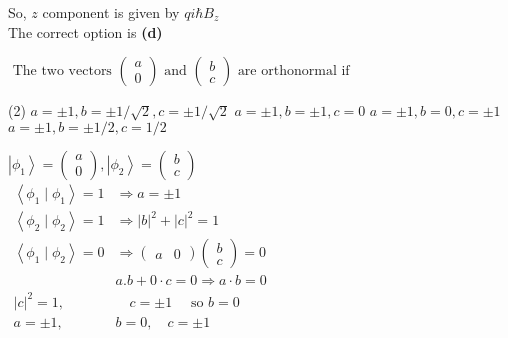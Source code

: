 \begin{enumerate}
\begin{answer}
	So, $z$ component is given by $q i \hbar B_{z}$\\
	The correct option is \textbf{(d)}
\end{answer}
\begin{minipage}{\textwidth}
	\item $\text { The two vectors }\left(\begin{array}{l}
		a \\
		0
	\end{array}\right) \text { and }\left(\begin{array}{l}
		b \\
		c
	\end{array}\right) \text { are orthonormal if }$
\end{minipage}
\begin{tasks}(2)
	\task[\textbf{A.}] $a=\pm 1, b=\pm 1 / \sqrt{2}, c=\pm 1 / \sqrt{2}$
	\task[\textbf{B.}] $a=\pm 1, b=\pm 1, c=0$
	\task[\textbf{C.}]$a=\pm 1, b=0, c=\pm 1$
	\task[\textbf{D.}] $a=\pm 1, b=\pm 1 / 2, c=1 / 2$
\end{tasks}
\begin{answer}
	$\left|\phi_{1}\right\rangle=\left(\begin{array}{l}
		a \\
		0
	\end{array}\right),\left|\phi_{2}\right\rangle=\left(\begin{array}{l}
		b \\
		c
	\end{array}\right)$\\
	$\begin{array}{ll}
		\left\langle\phi_{1} \mid \phi_{1}\right\rangle=1 & \Rightarrow a=\pm 1 \\
		\left\langle\phi_{2} \mid \phi_{2}\right\rangle=1 & \Rightarrow|b|^{2}+|c|^{2}=1 \\
		\left\langle\phi_{1} \mid \phi_{2}\right\rangle=0 & \Rightarrow\left(\begin{array}{ll}
			a & 0
		\end{array}\right)\left(\begin{array}{l}
			b \\
			c
		\end{array}\right)=0 \\
		& a . b+0 \cdot c=0 \Rightarrow a \cdot b=0 \\
		|c|^{2}=1, \quad & \quad c=\pm 1 \quad \text { so } b=0 \\
		a=\pm 1, \quad & b=0, \quad c=\pm 1
	\end{array}$\\

\end{answer}
\end{enumerate}
